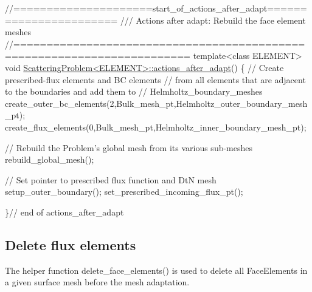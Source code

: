  
\begin{DoxyCodeInclude}
\textcolor{comment}{//=====================start\_of\_actions\_after\_adapt=======================}
\textcolor{comment}{///  Actions after adapt: Rebuild the face element meshes}
\textcolor{comment}{}\textcolor{comment}{//========================================================================}
\textcolor{keyword}{template}<\textcolor{keyword}{class} ELEMENT>
\textcolor{keywordtype}{void} \hyperlink{classScatteringProblem_a13d8f85e74666c260de7364917359ed5}{ScatteringProblem<ELEMENT>::actions\_after\_adapt}()
\{
 \textcolor{comment}{// Create prescribed-flux elements and BC elements }
 \textcolor{comment}{// from all elements that are adjacent to the boundaries and add them to }
 \textcolor{comment}{// Helmholtz\_boundary\_meshes}
 create\_outer\_bc\_elements(2,Bulk\_mesh\_pt,Helmholtz\_outer\_boundary\_mesh\_pt);
 create\_flux\_elements(0,Bulk\_mesh\_pt,Helmholtz\_inner\_boundary\_mesh\_pt);
 
 \textcolor{comment}{// Rebuild the Problem's global mesh from its various sub-meshes}
 rebuild\_global\_mesh();
 
 \textcolor{comment}{// Set pointer to prescribed flux function and DtN mesh}
 setup\_outer\_boundary();
 set\_prescribed\_incoming\_flux\_pt(); 
  
\}\textcolor{comment}{// end of actions\_after\_adapt}

\end{DoxyCodeInclude}




 

\hypertarget{index_delete}{}\subsection{Delete flux elements}\label{index_delete}
The helper function {\ttfamily delete\+\_\+face\+\_\+elements()} is used to delete all {\ttfamily Face\+Elements} in a given surface mesh before the mesh adaptation.

